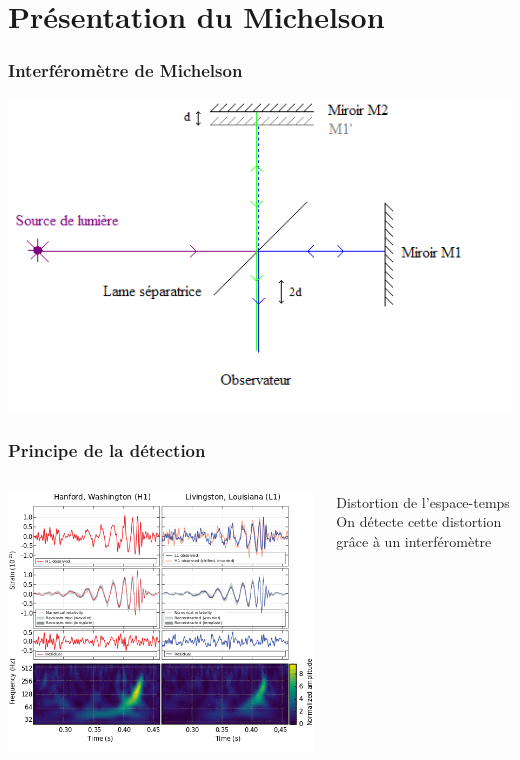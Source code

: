 \documentclass{beamer}
\begin{document}
\section{Présentation du Michelson}

\begin{frame}
	\frametitle{Interféromètre de Michelson}
	\includegraphics[scale=0.5]{Docs/interferometre_michelson.png}
\end{frame}


\begin{frame}
	\frametitle{Principe de la détection}
	\begin{columns}
		\begin{column}{0.5\textwidth}
			\includegraphics[width=\textwidth]{Docs/detection.png}		
		\end{column}
		\begin{column}{0.5\textwidth}
			Distortion de l'espace-temps
			\\
			On détecte cette distortion grâce à un interféromètre
		\end{column}
	\end{columns}
\end{frame}
\end{document}
